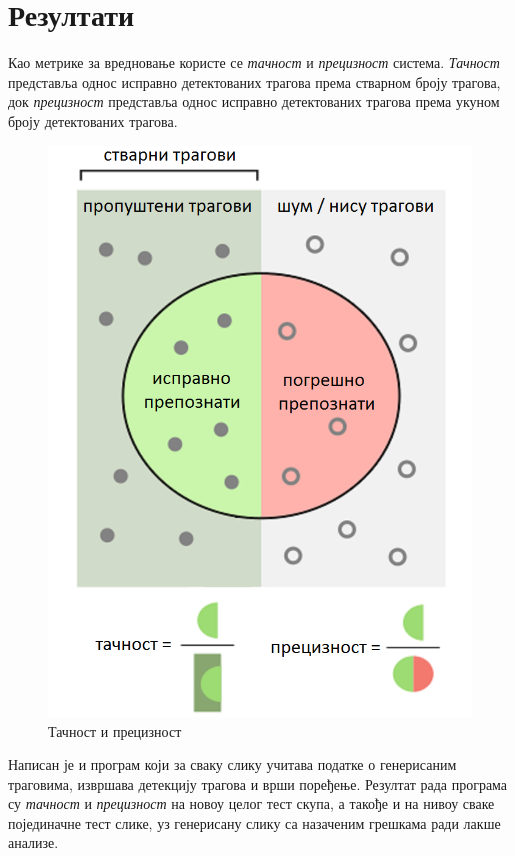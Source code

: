 \documentclass[11pt,a4paper,serbian,oneside]{book}
\begin{document}
\section{Резултати}

Као метрике за вредновање користе се \textit{тачност} и \textit{прецизност} система. \textit{Тачност} представља однос исправно детектованих трагова према стварном броју трагова, док \textit{прецизност} представља однос исправно детектованих трагова према укуном броју детектованих трагова.

\begin{figure}[H]
\begin{center}
\includegraphics[width=120mm]{images/recall_prec.png}
\end{center}
\caption{Тачност и прецизност}
\label{fig:recall_prec}
\end{figure}

Написан је и програм који за сваку слику учитава податке о генерисаним траговима, извршава детекцију трагова и врши поређење. Резултат рада програма су \textit{тачност} и \textit{прецизност} на новоу целог тест скупа, а такође и на нивоу сваке појединачне тест слике, уз генерисану слику са назаченим грешкама ради лакше анализе.
\end{document}
